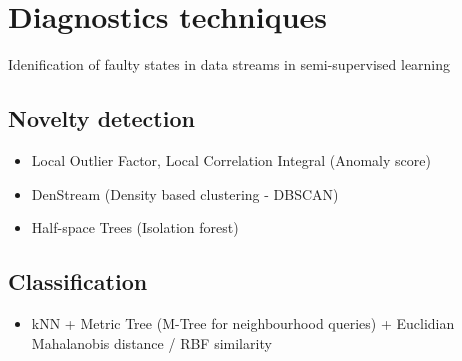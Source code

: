 \section{Diagnostics techniques}
Idenification of faulty states in data streams in semi-supervised learning

\cite{yu_analysis_2021}

\subsection{Novelty detection}
\cite{gervasi_anomaly_2020}

\begin{itemize}
\item Local Outlier Factor, Local Correlation Integral (Anomaly score)
	\cite{janssens_one-class_2007}
	\cite{yu_designing_2020}

\item DenStream (Density based clustering - DBSCAN)
	\cite{cao_density-based_2006}
	\cite{shukla_modified_2017}
	\cite{aggarwal_data_2014}
	\cite{ghesmoune_state---art_2016}
	\cite{zhao_cluster-reduce_2021}
	
\item Half-space Trees (Isolation forest)
	\cite{tan_fast_2011}
	\cite{gervasi_anomaly_2020}
	
\end{itemize}

\subsection{Classification}
\begin{itemize}
\item kNN + Metric Tree (M-Tree for neighbourhood queries) + Euclidian Mahalanobis distance /  RBF similarity

\cite{sheng_review_2020}
\cite{wagner_semi-supervised_2018}
\cite{hubert_minimum_2018}
\end{itemize}

